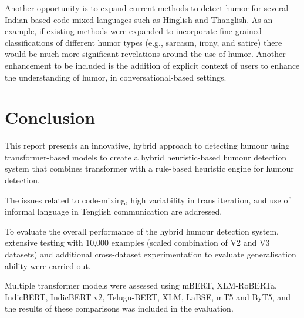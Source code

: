 \documentclass[conference]{IEEEtran}
\begin{document}
Another opportunity is to expand current methods to detect humor for several Indian based code mixed languages such as Hinglish and Thanglish. As an example, if existing methods were expanded to incorporate fine-grained classifications of different humor types (e.g., sarcasm, irony, and satire) there would be much more significant revelations around the use of humor. Another enhancement to be included is the addition of explicit context of users to enhance the understanding of humor, in conversational-based settings.

\section{Conclusion}

This report presents an innovative, hybrid approach to detecting humour using transformer-based models to create a hybrid heuristic-based humour detection system that combines transformer with a rule-based heuristic engine for humour detection.

The issues related to code-mixing, high variability in transliteration, and use of informal language in Tenglish communication are addressed.

To evaluate the overall performance of the hybrid humour detection system, extensive testing with 10,000 examples (scaled combination of V2 and V3 datasets) and additional cross-dataset experimentation to evaluate generalisation ability were carried out.

Multiple transformer models were assessed using mBERT, XLM-RoBERTa, IndicBERT, IndicBERT v2, Telugu-BERT, XLM, LaBSE, mT5 and ByT5, and the results of these comparisons was included in the evaluation.
\end{document}
